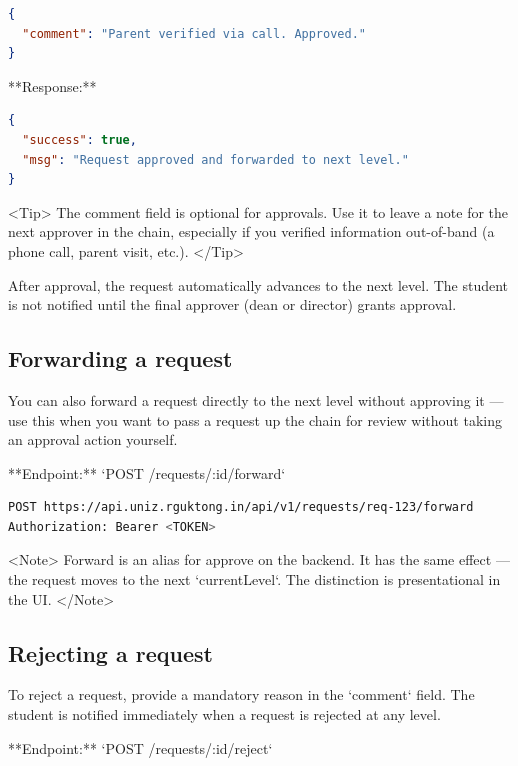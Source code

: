 \begin{lstlisting}[language=json]
{
  "comment": "Parent verified via call. Approved."
}

\end{lstlisting}

**Response:**

\begin{lstlisting}[language=json]
{
  "success": true,
  "msg": "Request approved and forwarded to next level."
}

\end{lstlisting}

<Tip>
  The comment field is optional for approvals. Use it to leave a note for the
  next approver in the chain, especially if you verified information out-of-band
  (a phone call, parent visit, etc.).
</Tip>

After approval, the request automatically advances to the next level. The student is not notified until the final approver (dean or director) grants approval.

\subsection{Forwarding a request}

You can also forward a request directly to the next level without approving it — use this when you want to pass a request up the chain for review without taking an approval action yourself.

**Endpoint:** `POST /requests/:id/forward`

\begin{lstlisting}[language=bash]
POST https://api.uniz.rguktong.in/api/v1/requests/req-123/forward
Authorization: Bearer <TOKEN>

\end{lstlisting}

<Note>
  Forward is an alias for approve on the backend. It has the same effect — the
  request moves to the next `currentLevel`. The distinction is presentational in
  the UI.
</Note>

\subsection{Rejecting a request}

To reject a request, provide a mandatory reason in the `comment` field. The student is notified immediately when a request is rejected at any level.

**Endpoint:** `POST /requests/:id/reject`

